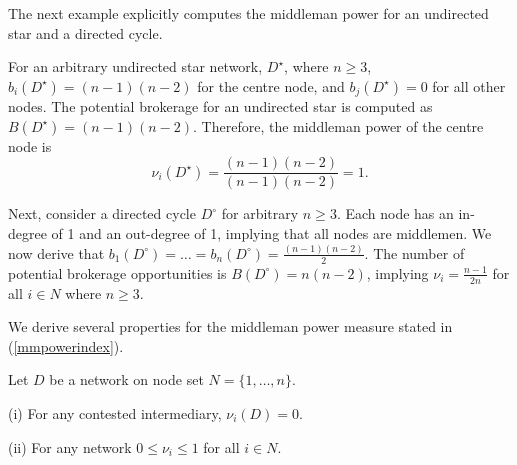 The next example explicitly computes the middleman power for an undirected star and a directed cycle.

\begin{example} \label{starcycle}
For an arbitrary undirected star network, $D^{\star}$, where $n \geqslant 3$, $b_{i}(D^{\star}) = (n-1)(n-2)$ for the centre node, and $b_{j}(D^{\star})=0$ for all other nodes. The potential brokerage for an undirected star is computed as $B(D^{\star}) = (n-1)(n-2)$. Therefore, the middleman power of the centre node is
\begin{equation}
\nu_{i}(D^{\star}) = \frac{(n-1)(n-2)}{(n-1)(n-2)} = 1 .
\end{equation}

\noindent Next, consider a directed cycle $D^{\circ}$ for arbitrary $n\geqslant 3$. Each node has an in-degree of 1 and an out-degree of 1, implying that all nodes are middlemen. We now derive that $b_{1}(D^{\circ}) = \ldots = b_{n}(D^{\circ}) = \frac{(n-1)(n-2)}{2}$. The number of potential brokerage opportunities is $B (D^{\circ}) = n(n-2)$, implying $\nu_i = \frac{n-1}{2n}$ for all $i \in N$ where $n \geqslant 3$.
\end{example}

We derive several properties for the middleman power measure stated in (\ref{mmpowerindex}).

\begin{theorem} \label{middlemanpowert}
Let $D$ be a network on node set $N=\{1, \ldots ,n\}$.
\begin{abet}
\item[(i)] For any contested intermediary, $\nu_{i}(D) = 0$.
\item[(ii)] For any network $0 \leqslant \nu_{i} \leqslant 1$ for all $i \in N$.
\end{abet}
\end{theorem}

